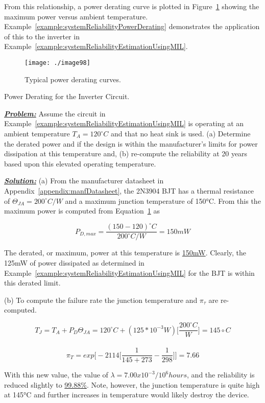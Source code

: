 {From this relationship, a power derating curve is plotted in 
Figure~\ref{figure:typicalDeratingCurve}
showing the maximum power versus ambient temperature. 
Example~\ref{example:systemReliabilityPowerDerating}
demonstrates the application of this to the inverter in 
Example~\ref{example:systemReliabilityEstimationUsingMIL}.

\begin{figure}[h]
\centering
\texttt{[image: ./image98]}
\caption{Typical power derating curves.}
\label{figure:typicalDeratingCurve}
\end{figure}

\begin{example}{Power Derating for the Inverter Circuit.}
\label{example:systemReliabilityPowerDerating}

\emph{\textbf{\ul{Problem:}}} Assume the circuit in 
Example~\ref{example:systemReliabilityEstimationUsingMIL} is
operating at an ambient temperature $T_A = 120^\circ C$ and 
that no heat sink is used.
(a) Determine the derated power and if the design is within the
manufacturer's limits for power dissipation at this temperature and, (b)
re-compute the reliability at 20 years based upon this elevated
operating temperature.

\emph{\textbf{\ul{Solution:}}}
(a) From the manufacturer datasheet in Appendix~\ref{appendix:manfDatasheet}, 
the 2N3904 BJT has a
thermal resistance of $\Theta_{JA} = 200^\circ C/W$ and a
maximum junction temperature of 150°C. From this the maximum power is
computed from Equation~\ref{figure:typicalDeratingCurve} as

$$P_{D,max} = \frac{(150 - 120)^\circ C}{200^\circ C/W} = 150mW$$

The derated, or maximum, power at this temperature is \ul{150mW}.
Clearly, the 125mW of power dissipated as determined in 
Example~\ref{example:systemReliabilityEstimationUsingMIL} for
the BJT is within this derated limit.

(b) To compute the failure rate the junction temperature and
$\pi_\tau$ are re-computed.

$$T_J = T_A + P_D\Theta_{JA} = 120^\circ C + (125*10^{-3} W) \big[ \frac{200^\circ C}{W} \big]= 145\circ C $$\\
$$\pi_T = exp\big[ -2114 \big[ \frac{1}{145+273} - \frac{1}{298} \big] \big] = 7.66$$
\end{example}

With this new value, the value of $\lambda=7.00x10^{-3}/10^6 hours$, and 
the reliability is reduced slightly to \ul{99.88\%}. Note, however, the junction 
temperature is
quite high at 145°C and further increases in temperature would likely
destroy the device.

}
